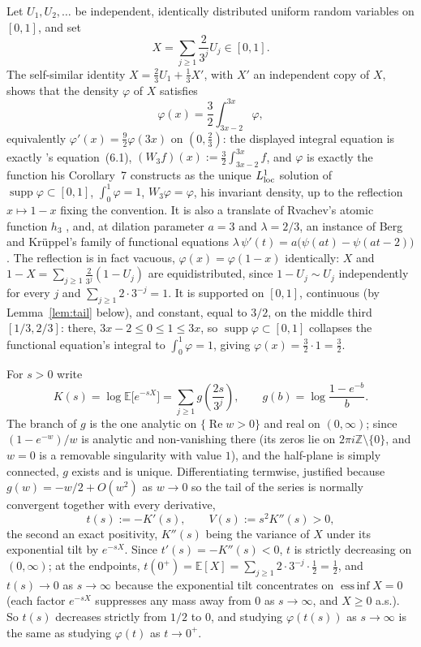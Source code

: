 \documentclass[11pt]{amsart}
\theoremstyle{plain}
\theoremstyle{definition}
\theoremstyle{remark}
\newcommand{\Z}{\mathbb{Z}}
\begin{document}
Let $U_1, U_2, \dots$ be independent, identically distributed uniform random variables on $[0,1]$,
and set
\[
X = \sum_{j \ge 1} \frac{2}{3^j} U_j \in [0,1].
\]
The self-similar identity $X = \tfrac{2}{3}U_1 + \tfrac{1}{3}X'$, with $X'$ an independent copy of
$X$, shows that the density $\varphi$ of $X$ satisfies
\[
\varphi(x) = \frac{3}{2}\int_{3x-2}^{3x} \varphi,
\]
equivalently $\varphi'(x) = \tfrac{9}{2}\varphi(3x)$ on $(0, \tfrac{2}{3})$: the displayed integral
equation is exactly \cite{wirsching2003}'s equation~(6.1), $(W_3f)(x) := \tfrac32\int_{3x-2}^{3x}
f$, and $\varphi$ is exactly the function his Corollary~7 constructs as the unique $L^1_{\rm loc}$
solution of $\operatorname{supp}\varphi\subset[0,1]$, $\int_0^1\varphi=1$, $W_3\varphi=\varphi$,
his invariant density, up to the reflection $x \mapsto 1-x$ fixing the convention. It is also a
translate of Rvachev's atomic function $h_3$ \cite{rvachev1990}, and, at dilation parameter $a=3$
and $\lambda=2/3$, an instance of
Berg and Kr\"uppel's family of functional equations $\lambda\, \psi'(t) = a\bigl(\psi(at) -
\psi(at-2)\bigr)$. The reflection is in fact vacuous, $\varphi(x)=\varphi(1-x)$ identically: $X$ and
$1-X=\sum_{j\ge1}\tfrac{2}{3^j}(1-U_j)$ are equidistributed, since $1-U_j\sim U_j$ independently
for every $j$ and $\sum_{j\ge1}2\cdot3^{-j}=1$. It is supported on $[0,1]$, continuous (by
Lemma~\ref{lem:tail} below), and constant, equal to $3/2$, on the middle third $[1/3, 2/3]$: there,
$3x-2\le0\le1\le3x$, so $\operatorname{supp}\varphi\subset[0,1]$ collapses the functional equation's
integral to $\int_0^1\varphi=1$, giving $\varphi(x)=\tfrac32\cdot1=\tfrac32$.

For $s > 0$ write
\[
K(s) = \log \mathbb{E}\bigl[e^{-sX}\bigr] = \sum_{j \ge 1} g\!\left(\frac{2s}{3^j}\right), \qquad
g(b) = \log\frac{1-e^{-b}}{b}.
\]
The branch of $g$ is the one analytic on $\{\operatorname{Re} w > 0\}$ and real on $(0,\infty)$;
since $(1-e^{-w})/w$ is analytic and non-vanishing there (its zeros lie on $2\pi i \Z \setminus
\{0\}$, and $w=0$ is a removable singularity with value $1$), and the half-plane is simply
connected, $g$ exists and is unique. Differentiating termwise, justified because $g(w) = -w/2 +
O(w^2)$ as $w \to 0$ so the tail of the series is normally convergent together with every
derivative,
\[
t(s) := -K'(s), \qquad V(s) := s^2 K''(s) > 0,
\]
the second an exact positivity, $K''(s)$ being the variance of $X$ under its exponential tilt by
$e^{-sX}$. Since $t'(s) = -K''(s) < 0$, $t$ is strictly decreasing on $(0,\infty)$; at the
endpoints, $t(0^+) = \mathbb E[X] = \sum_{j\ge1} 2\cdot3^{-j}\cdot\tfrac12 = \tfrac12$, and
$t(s)\to0$ as $s\to\infty$ because the exponential tilt concentrates on $\operatorname{ess\,inf}
X=0$ (each factor $e^{-sX}$ suppresses any mass away from $0$ as $s\to\infty$, and $X\ge0$ a.s.).
So $t(s)$ decreases strictly from $1/2$ to $0$, and studying $\varphi(t(s))$ as $s \to \infty$ is
the same as studying $\varphi(t)$ as $t \to 0^+$.
\end{document}
